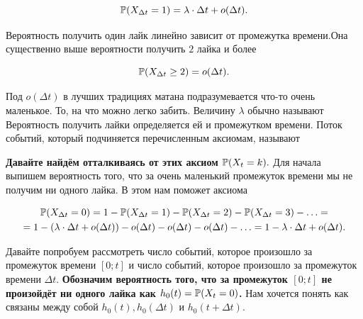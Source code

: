 \documentclass[12pt, a4paper, oneside]{article}
\begin{document}
\begin{enumerate}
$$
\mathbb{P}(X_{\Delta t} = 1) = \lambda \cdot \Delta t + o(\Delta t).
$$

Вероятность получить один лайк линейно зависит от промежутка времени.Она существенно выше вероятности получить $2$ лайка и более

$$
\mathbb{P}(X_{\Delta t} \ge 2) = o(\Delta t).
$$

Под $o(\Delta t)$ в лучших традициях матана подразумевается что-то очень маленькое. То, на что можно легко забить.  Величину $\lambda$ обычно называют  Вероятность получить лайки определяется ей и промежутком времени. Поток событий, который подчиняется перечисленным аксиомам, называют 
\end{enumerate}

\textbf{Давайте найдём отталкиваясь от этих аксиом $\mathbb{P}(X_t = k).$}  Для начала выпишем вероятность того, что за очень маленький промежуток времени мы не получим ни одного лайка. В этом нам поможет аксиома 

\begin{multline*}
\mathbb{P}(X_{\Delta t} = 0) = 1 - \mathbb{P}(X_{\Delta t} = 1) - \mathbb{P}(X_{\Delta t} = 2) - \mathbb{P}(X_{\Delta t} = 3) - \ldots = \\ = 1 - (\lambda \cdot \Delta t + o(\Delta t)) - o(\Delta t) - o(\Delta t) - o(\Delta t) - \ldots = 1 - \lambda \cdot \Delta t + o(\Delta t).
\end{multline*}

Давайте попробуем рассмотреть число событий, которое произошло за промежуток времени $[0;t]$ и число событий, которое произошло за промежуток времени $\Delta t$.  \textbf{Обозначим вероятность того, что за промежуток $[0;t]$ не произойдёт ни одного лайка как $h_0(t) = \mathbb{P}(X_t = 0)$.} Нам хочется понять как связаны между собой $h_0(t), h_0(\Delta t)$ и $h_0(t + \Delta t)$. 


\begin{center} 
\end{center} 
\end{document}

